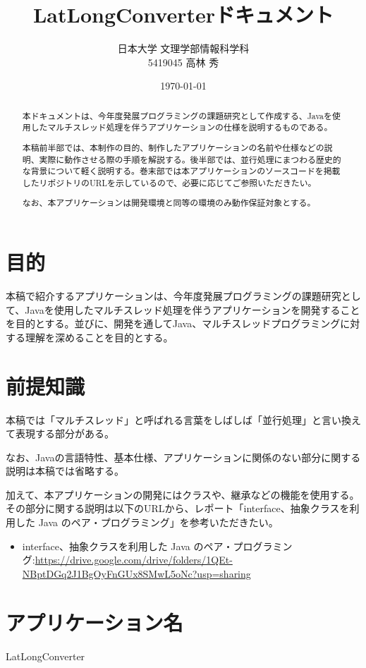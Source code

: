 \documentclass[dvipdfmx, titlepage]{jsarticle}
\title{LatLongConverterドキュメント}
\date{\today}
\author{日本大学 文理学部情報科学科\\5419045 高林 秀}
\begin{document}
\maketitle

\begin{abstract}
本ドキュメントは、今年度発展プログラミングの課題研究として作成する、Javaを使用したマルチスレッド処理を伴うアプリケーションの仕様を説明するものである。\par
本稿前半部では、本制作の目的、制作したアプリケーションの名前や仕様などの説明、実際に動作させる際の手順を解説する。後半部では、並行処理にまつわる歴史的な背景について軽く説明する。巻末部では本アプリケーションのソースコードを掲載したリポジトリのURLを示しているので、必要に応じてご参照いただきたい。\par
なお、本アプリケーションは開発環境と同等の環境のみ動作保証対象とする。
\end{abstract}

\section{目的}
本稿で紹介するアプリケーションは、今年度発展プログラミングの課題研究として、Javaを使用したマルチスレッド処理を伴うアプリケーションを開発することを目的とする。並びに、開発を通してJava、マルチスレッドプログラミングに対する理解を深めることを目的とする。\par
\section{前提知識}
本稿では「マルチスレッド」と呼ばれる言葉をしばしば「並行処理」と言い換えて表現する部分がある。\par
なお、Javaの言語特性、基本仕様、アプリケーションに関係のない部分に関する説明は本稿では省略する。\par
加えて、本アプリケーションの開発にはクラスや、継承などの機能を使用する。その部分に関する説明は以下のURLから、レポート「interface、抽象クラスを利用した Java のペア・プログラミング」を参考いただきたい。
\begin{itemize}
  \item interface、抽象クラスを利用した Java のペア・プログラミング:\url{https://drive.google.com/drive/folders/1QEt-NBptDGq2J1BgOyFnGUx8SMwL5oNc?usp=sharing}
\end{itemize}
\section{アプリケーション名}
LatLongConverter
\end{document}
